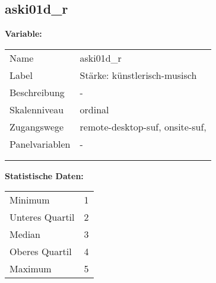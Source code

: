 	
	
	\subsection{aski01d\_r}
	\label{subSection:aski01d_r}

	\noindent\textbf{Variable:}\\
		\begin{tabular}{lL{11.3cm}}
			\label{tableVariable:aski01d_r}
			Name & aski01d\_r \\
			Label & Stärke: künstlerisch-musisch \\
			Beschreibung & - \\
			Skalenniveau & ordinal \\
			Zugangswege &
				remote-desktop-suf,
				onsite-suf,
 \\
			Panelvariablen & -
			 \\
			 \\
 \\
		\end{tabular}



		\vspace*{1 cm}
		\noindent\textbf{Statistische Daten:}\\
			\begin{tabular}{ll}
				\label{tableStatistics:aski01d_r}
					Minimum & 1 \\
					Unteres Quartil & 2 \\
					Median & 3 \\
					Oberes Quartil & 4 \\
					Maximum & 5 \\
			\end{tabular}



